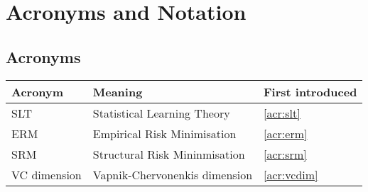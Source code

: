 
\chapter{Acronyms and Notation}

\section*{Acronyms}

\begin{tabular}{l l l}

\bf{Acronym} & \bf{Meaning} & \bf{First introduced} \\ \hline \hline

SLT	& Statistical Learning Theory 	& \ref{acr:slt} \\
ERM	& Empirical Risk Minimisation 	& \ref{acr:erm} \\
SRM	& Structural Risk Mininmisation & \ref{acr:srm} \\
VC dimension & Vapnik-Chervonenkis dimension & \ref{acr:vcdim} \\
\hline

\end{tabular}

